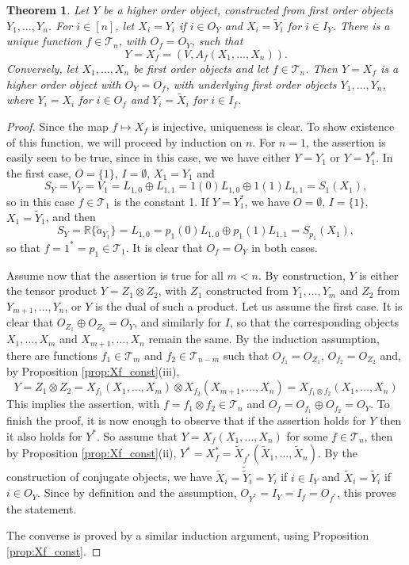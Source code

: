 \documentclass[12pt]{article}
\newtheorem{theorem}{Theorem}
\theoremstyle{definition}
\theoremstyle{remark}
\def\Te{\mathcal T}
\begin{document}
\begin{theorem}\label{thm:boolean} Let $Y$ be a higher order object, constructed from first
order objects $Y_1,\dots,Y_n$. For $i\in [n]$, let 
$X_i=Y_i$ if $i\in O_Y$ and $X_i=\tilde Y_i$ for $i\in I_Y$. 
There is a unique function $f\in \Te_n$, with $O_f=O_Y$,  such that 
\[
Y= X_f=(V, A_f(X_1,\dots,X_n)).
\]
Conversely, let $X_1,\dots, X_n$  be first order objects  and let
$f\in \Te_n$. Then $Y=X_f$ is a higher order object with $O_Y=O_f$, with underlying first
order objects $Y_1,\dots, Y_n$, where $Y_i=X_i$ for $i\in O_f$ and $Y_i=\tilde X_i$ for
$i\in I_f$.  

\end{theorem}

\begin{proof} Since the map $f\mapsto X_f$ is injective, uniqueness is clear.  To show existence of this
function, we will proceed by induction on $n$. For $n=1$, the assertion is easily seen
to be true, since in this case, we we have either $Y=Y_1$ or $Y=Y_1^*$. In the first case,
$O=\{1\}$, $I=\emptyset$, 
$X_1=Y_1$ and 
\[
S_Y=V_Y=V_1=L_{1,0}\oplus L_{1,1}=1(0)L_{1,0}\oplus 1(1)L_{1,1}=S_1(X_1),
\]
so in this case $f\in \Te_1$ is the constant 1. If $Y=Y_1^*$, we have $O=\emptyset$,
$I=\{1\}$, $X_1=\tilde
Y_1$, and then
\[
S_Y=\mathbb R\{\tilde a_{Y_1}\}=L_{1,0}=p_1(0)L_{1,0}\oplus p_1(1)L_{1,1}=S_{p_1}(X_1),
\]
so that $f=1^*=p_{1}\in \Te_1$. It is clear that $O_f=O_Y$ in both cases. 

Assume now that the assertion is true for
all $m<n$. By construction, $Y$ is either the tensor
product $Y=Z_1\otimes Z_2$, with
$Z_1$ constructed from $Y_{1},\dots, Y_{m}$ and $Z_2$ from $Y_{{m+1}},\dots,
Y_{n}$,
 or $Y$ is the dual of such a product. Let us assume the first case. It is clear that
 $O_{Z_1}\oplus O_{Z_2}=O_Y$, and similarly for $I$, so that the corresponding objects
 $X_1,\dots, X_m$ and $X_{m+1},\dots,X_n$  remain the same. By the induction 
assumption, there are functions $f_1\in \Te_m$ and $f_2\in \Te_{n-m}$ such that
$O_{f_1}=O_{Z_1}$, $O_{f_2}=O_{Z_2}$ and,  by Proposition \ref{prop:Xf_const}(iii), 
\[
Y=Z_1\otimes Z_2=X_{f_1}(X_1,\dots,X_m)\otimes X_{f_2}(X_{m+1},\dots,X_n)=X_{f_1\otimes
f_2}(X_1,\dots,X_n)
\]
This implies the assertion, with $f=f_1\otimes f_2\in \Te_n$ and $O_f=O_{f_1}\oplus
O_{f_2}=O_Y$. 
To finish the proof, it is now enough to observe that if the assertion holds for $Y$ then
it also  holds for $Y^*$. So assume that $Y=X_f(X_1,\dots,X_n)$ for some $f\in \Te_n$, 
then by Proposition \ref{prop:Xf_const}(ii), $Y^*=X_f^*=\tilde X_{f^*}(\tilde X_1,\dots,\tilde X_n)$. 
By the construction of conjugate objects, we have  $\tilde X_i=\tilde{\tilde Y}_i=Y_i$
if $i\in I_{Y}$ and $\tilde X_i=\tilde {Y}_i$ if $i\in O_Y$. Since by definition and the
assumption,
$O_{Y^*}=I_Y=I_f=O_{f^*}$, this proves the statement.

The converse is proved by a similar induction argument, using Proposition
\ref{prop:Xf_const}.

\end{proof}
\end{document}
